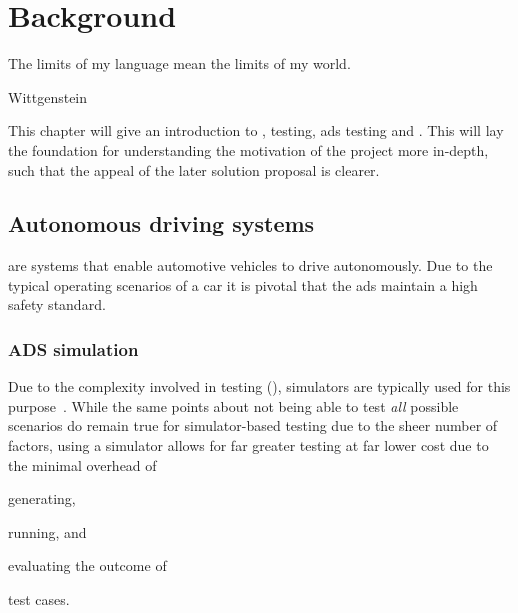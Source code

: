 \chapter{Background}\label{chp:background}

\epigraph{The limits of my language mean the limits of my world.}{Wittgenstein}

This chapter will give an introduction to , testing,
\acrshort{ads} testing and .
This will lay the foundation for understanding the motivation of the project more
in-depth, such that the appeal of the later solution proposal is clearer.


\section{Autonomous driving systems}
% 


 are systems that enable automotive vehicles to drive autonomously. Due to the
typical operating scenarios of a car it is pivotal that the \acrshort{ads} maintain a
high safety standard.

\subsection{ADS simulation}

Due to the complexity involved in testing  (),
simulators are typically used for this purpose~\cite{DeepScenario}. While the same points about not
being able to test \textit{all} possible scenarios do remain true for simulator-based testing due to
the sheer number of factors, using a simulator allows for far greater testing at far lower cost due
to the minimal overhead of
\begin{inparaenum}
    \item generating,
    \item running, and
    \item evaluating the outcome of
\end{inparaenum}
test cases.

